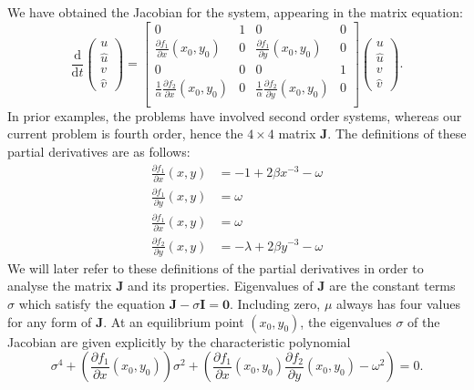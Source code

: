 We have obtained the Jacobian for the system, appearing in the matrix equation:
\begin{equation}
    \frac{\mathrm{d}}{\mathrm{d}t} \begin{pmatrix}
        u \\
        \hat{u} \\
        v \\
        \hat{v}
    \end{pmatrix} = \begin{bmatrix}
        0 & 1 & 0 & 0 \\
        \frac{\partial f_1}{\partial x}(x_0,y_0) & 0 & \frac{\partial f_1}{\partial y}(x_0,y_0) & 0 \\
        0 & 0 & 0 & 1 \\
        \frac{1}{\alpha}\frac{\partial f_2}{\partial x}(x_0,y_0) & 0 & \frac{1}{\alpha}\frac{\partial f_2}{\partial y}(x_0,y_0) & 0 \\
    \end{bmatrix} \begin{pmatrix}
        u \\
        \hat{u} \\
        v \\
        \hat{v}
    \end{pmatrix}.
    \label{eqn:twomass_matrix_jacobian_quad}
\end{equation}
In prior examples, the problems have involved second order systems,
whereas our current problem is fourth order,
hence the \(4\times4\) matrix \(\mathbf{J}\).
The definitions of these partial derivatives are as follows:
\begin{equation}
    \begin{aligned}
        \frac{\partial f_1}{\partial x}(x,y) &= -1 + 2\beta x^{-3} - \omega \\
        \frac{\partial f_1}{\partial y}(x,y) &= \omega \\
        \frac{\partial f_1}{\partial x}(x,y) &= \omega \\
        \frac{\partial f_2}{\partial y}(x,y) &= -\lambda +2\beta y^{-3} - \omega
    \end{aligned}
    \label{eqn:twomass_partial_derivatives}
\end{equation}
We will later refer to these definitions of the partial derivatives in order to analyse the matrix $\mathbf{J}$ and its properties.
Eigenvalues of $\mathbf{J}$ are the constant terms $\sigma$ which satisfy the equation $\mathbf{J} - \sigma \mathbf{I} = \mathbf{0}$.
Including zero, $\mu$ always has four values for any form of $\mathbf{J}$.
At an equilibrium point \((x_0,y_0)\),
the eigenvalues $\sigma$ of the Jacobian are given explicitly by the characteristic polynomial
\begin{equation}
	\sigma^4 + \left(\frac{\partial f_1}{\partial x}(x_0,y_0)\right)\sigma^2 + \left(\frac{\partial f_1}{\partial x}(x_0,y_0) \frac{\partial f_2}{\partial y}(x_0,y_0) - \omega^2\right) = 0.
\end{equation}

